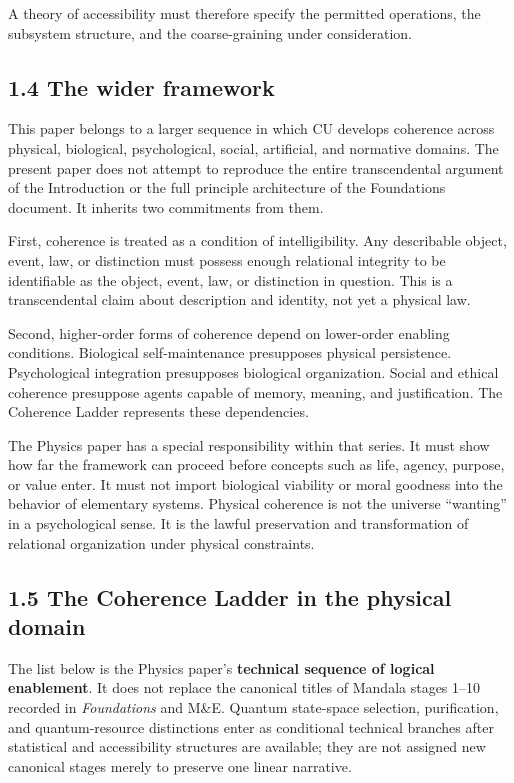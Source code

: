 \documentclass[
  11pt,
]{article}
\begin{document}
A theory of accessibility must therefore specify the permitted
operations, the subsystem structure, and the coarse-graining under
consideration.

\subsection{1.4 The wider framework}\label{the-wider-framework}

This paper belongs to a larger sequence in which CU develops coherence
across physical, biological, psychological, social, artificial, and
normative domains. The present paper does not attempt to reproduce the
entire transcendental argument of the Introduction or the full principle
architecture of the Foundations document. It inherits two commitments
from them.

First, coherence is treated as a condition of intelligibility. Any
describable object, event, law, or distinction must possess enough
relational integrity to be identifiable as the object, event, law, or
distinction in question. This is a transcendental claim about
description and identity, not yet a physical law.

Second, higher-order forms of coherence depend on lower-order enabling
conditions. Biological self-maintenance presupposes physical
persistence. Psychological integration presupposes biological
organization. Social and ethical coherence presuppose agents capable of
memory, meaning, and justification. The Coherence Ladder represents
these dependencies.

The Physics paper has a special responsibility within that series. It
must show how far the framework can proceed before concepts such as
life, agency, purpose, or value enter. It must not import biological
viability or moral goodness into the behavior of elementary systems.
Physical coherence is not the universe ``wanting'' in a psychological
sense. It is the lawful preservation and transformation of relational
organization under physical constraints.

\subsection{1.5 The Coherence Ladder in the physical
domain}\label{the-coherence-ladder-in-the-physical-domain}

The list below is the Physics paper's \textbf{technical sequence of
logical enablement}. It does not replace the canonical titles of Mandala
stages 1--10 recorded in \emph{Foundations} and M\&E. Quantum
state-space selection, purification, and quantum-resource distinctions
enter as conditional technical branches after statistical and
accessibility structures are available; they are not assigned new
canonical stages merely to preserve one linear narrative.
\end{document}

